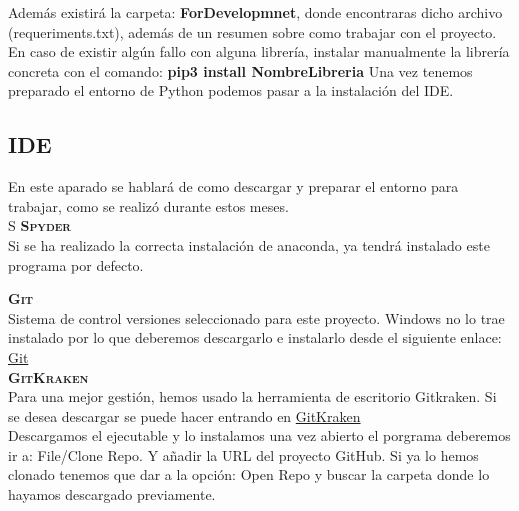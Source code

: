 Además existirá la carpeta: \textbf{ForDevelopmnet}, donde encontraras dicho archivo (requeriments.txt), además de un resumen sobre como trabajar con el proyecto.\\

En caso de existir algún fallo con alguna librería, instalar manualmente la librería concreta con el comando: \textbf{pip3 install NombreLibreria}
Una vez tenemos preparado el entorno de Python podemos pasar a la instalación del IDE.
\subsection{IDE}
En este aparado se hablará de como descargar y preparar el entorno para trabajar, como se realizó durante estos meses.\\S
\textbf{\textsc{Spyder}}\\
Si se ha realizado la correcta instalación de anaconda, ya tendrá instalado este programa por defecto.

\textbf{\textsc{Git}}\\
Sistema de control versiones seleccionado para este proyecto. Windows no lo trae instalado por lo que deberemos descargarlo e instalarlo desde el siguiente enlace: \href{https://git-scm.com/}{Git}\\

\textbf{\textsc{GitKraken}}\\
Para una mejor gestión, hemos usado la herramienta de escritorio Gitkraken. Si se desea descargar se puede hacer entrando en \href{https://gitkraken.com/}{GitKraken}\\
Descargamos el ejecutable y lo instalamos una vez abierto el porgrama deberemos ir a: File/Clone Repo. Y añadir la URL del proyecto GitHub. Si ya lo hemos clonado tenemos que dar a la opción: Open Repo y buscar la carpeta donde lo hayamos descargado previamente.\\


